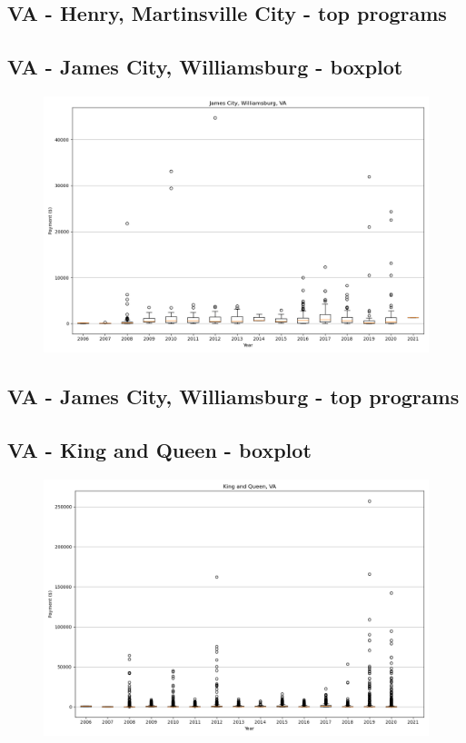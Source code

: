 \subsection*{VA - Henry, Martinsville City - top programs}

\newpage
\subsection*{VA - James City, Williamsburg - boxplot}
\begin{figure}[h]
\centering
\includegraphics[width=7in]{../output/boxplots/counties/James City, Williamsburg-VA_boxplot.png}
\end{figure}


\subsection*{VA - James City, Williamsburg - top programs}

\newpage
\subsection*{VA - King and Queen - boxplot}
\begin{figure}[h]
\centering
\includegraphics[width=7in]{../output/boxplots/counties/King and Queen-VA_boxplot.png}
\end{figure}


